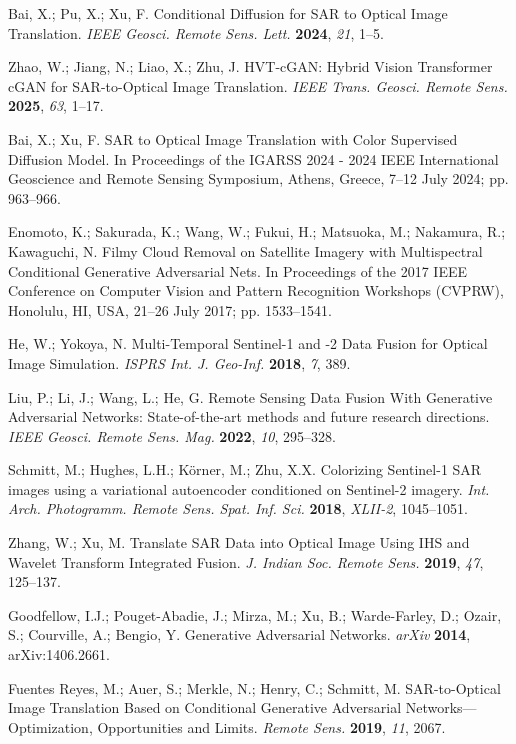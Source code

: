 Bai, X.; Pu, X.; Xu, F. Conditional Diffusion for SAR to Optical Image Translation. {\em IEEE Geosci. Remote Sens. Lett.} {\bf 2024}, {\em 21}, 1--5.

Zhao, W.; Jiang, N.; Liao, X.; Zhu, J. HVT-cGAN: Hybrid Vision Transformer cGAN for SAR-to-Optical Image Translation. {\em IEEE Trans. Geosci. Remote Sens.} {\bf 2025}, {\em 63}, 1--17.

Bai, X.; Xu, F. SAR to Optical Image Translation with Color Supervised Diffusion Model. In Proceedings of the IGARSS 2024 - 2024 IEEE International Geoscience and Remote Sensing Symposium, Athens, Greece, 7–12 July 2024; pp. 963--966.

Enomoto, K.; Sakurada, K.; Wang, W.; Fukui, H.; Matsuoka, M.; Nakamura, R.; Kawaguchi, N. Filmy Cloud Removal on Satellite Imagery with Multispectral Conditional Generative Adversarial Nets. In Proceedings of the 2017 IEEE Conference on Computer Vision and Pattern Recognition Workshops (CVPRW), Honolulu, HI, USA, 21–26 July 2017; pp. 1533--1541.

He, W.; Yokoya, N. Multi-Temporal Sentinel-1 and -2 Data Fusion for Optical Image Simulation. {\em ISPRS Int. J. Geo-Inf.} {\bf 2018}, {\em 7}, 389.

Liu, P.; Li, J.; Wang, L.; He, G. Remote Sensing Data Fusion With Generative Adversarial Networks: State-of-the-art methods and future research directions. {\em IEEE Geosci. Remote Sens. Mag.} {\bf 2022}, {\em 10}, 295--328.

Schmitt, M.; Hughes, L.H.; Körner, M.; Zhu, X.X. Colorizing Sentinel-1 SAR images using a variational autoencoder conditioned on Sentinel-2 imagery. {\em Int. Arch. Photogramm. Remote Sens. Spat. Inf. Sci.} {\bf 2018}, {\em XLII-2}, 1045--1051.

Zhang, W.; Xu, M. Translate SAR Data into Optical Image Using IHS and Wavelet Transform Integrated Fusion. {\em J. Indian Soc. Remote Sens.} {\bf 2019}, {\em 47}, 125--137.

Goodfellow, I.J.; Pouget-Abadie, J.; Mirza, M.; Xu, B.; Warde-Farley, D.; Ozair, S.; Courville, A.; Bengio, Y. Generative Adversarial Networks. {\em arXiv} {\bf 2014}, arXiv:1406.2661.

Fuentes Reyes, M.; Auer, S.; Merkle, N.; Henry, C.; Schmitt, M. SAR-to-Optical Image Translation Based on Conditional Generative Adversarial Networks—Optimization, Opportunities and Limits. {\em Remote Sens.} {\bf 2019}, {\em 11}, 2067.


